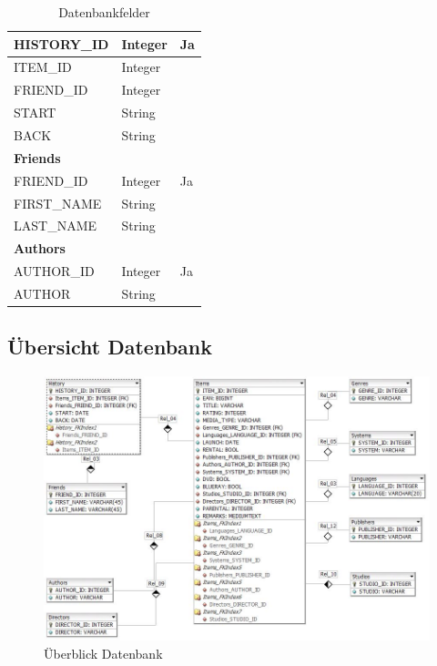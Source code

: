 \begin{table} [htbp]
\begin{center}
\begin{tabular}{|l|l|l|}
			HISTORY\_ID & Integer & Ja \\ \hline
			\rowcolor{DarkSeaGreen} ITEM\_ID & Integer & \\ \hline
			FRIEND\_ID & Integer & \\ \hline
			\rowcolor{DarkSeaGreen} START & String & \\ \hline
			BACK & String & \\ \hline
			\rowcolor{DarkSeaGreen} \textbf{Friends} & & \\ \hline
			FRIEND\_ID & Integer & Ja \\ \hline
			\rowcolor{DarkSeaGreen} FIRST\_NAME & String & \\ \hline
			LAST\_NAME & String & \\ \hline
			\rowcolor{DarkSeaGreen} \textbf{Authors} & & \\ \hline
			AUTHOR\_ID & Integer & Ja \\ \hline
			\rowcolor{DarkSeaGreen} AUTHOR & String & \\ \hline 
		\end{tabular}
		\caption{Datenbankfelder}
		\label{tab:Datenbankfelder}
	\end{center}
\end{table}

\newpage

\begin{landscape}
	\subsection{Übersicht Datenbank}
	\label{subsec:UebersichtDB}
	\begin{figure}[htbp]
		\centering
		\includegraphics[scale=0.6]{pic/DbDesign}
		\caption{Überblick Datenbank}
	\end{figure}
\end{landscape}